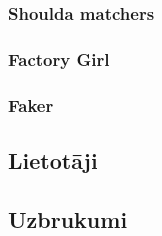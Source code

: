 \subsubsection{Shoulda matchers}
\subsubsection{Factory Girl}
\subsubsection{Faker}

\subsection{Lietotāji}
\subsection{Uzbrukumi}